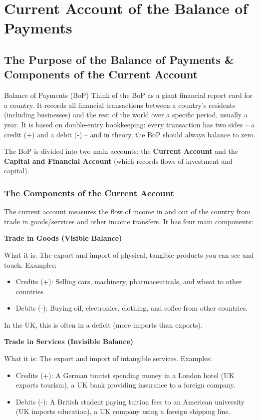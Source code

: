 \documentclass[11pt, a4paper, twoside]{book}
\begin{document}
\section{Current Account of the Balance of Payments}

\subsection{The Purpose of the Balance of Payments \& Components of the Current Account}

\begin{keyterm}{Balance of Payments (BoP)}
Think of the BoP as a giant financial report card for a country. It records all financial transactions between a country's residents (including businesses) and the rest of the world over a specific period, usually a year. It is based on double-entry bookkeeping: every transaction has two sides -- a credit (+) and a debit (-) -- and in theory, the BoP should always balance to zero.
\end{keyterm}

The BoP is divided into two main accounts: the \textbf{Current Account} and the \textbf{Capital and Financial Account} (which records flows of investment and capital).

\subsubsection{The Components of the Current Account}

The current account measures the flow of income in and out of the country from trade in goods/services and other income transfers. It has four main components:

\textbf{Trade in Goods (Visible Balance)}

What it is: The export and import of physical, tangible products you can see and touch. Examples:
\begin{itemize}
  \item Credits (+): Selling cars, machinery, pharmaceuticals, and wheat to other countries.
  \item Debits (-): Buying oil, electronics, clothing, and coffee from other countries.
\end{itemize}
In the UK, this is often in a deficit (more imports than exports).

\textbf{Trade in Services (Invisible Balance)}

What it is: The export and import of intangible services. Examples:
\begin{itemize}
  \item Credits (+): A German tourist spending money in a London hotel (UK exports tourism), a UK bank providing insurance to a foreign company.
  \item Debits (-): A British student paying tuition fees to an American university (UK imports education), a UK company using a foreign shipping line.
\end{itemize}
\end{document}
